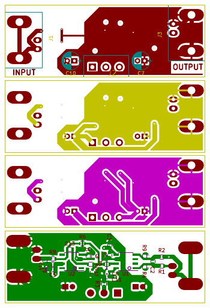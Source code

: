 \documentclass[10pt,fleqn]{article}
\begin{document}
\begin{center}
  \includegraphics[width=\textwidth]{pre-amp-F.pdf}\\
  \includegraphics[width=\textwidth]{pre-amp-In1.pdf}\\
  \includegraphics[width=\textwidth]{pre-amp-In2.pdf}\\
  \includegraphics[width=\textwidth]{pre-amp-B.pdf}
\end{center}
\end{document}
